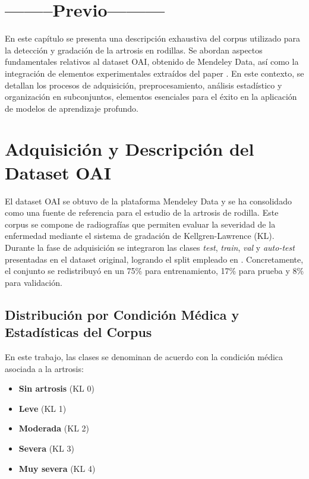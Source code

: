 \documentclass[11pt,spanish,listoffigures,listoftables]{tfgetsinf}
\begin{document}
\section{--------Previo---------}
En este capítulo se presenta una descripción exhaustiva del corpus utilizado para la detección y gradación de la artrosis en rodillas. Se abordan aspectos fundamentales relativos al dataset OAI, obtenido de Mendeley Data, así como la integración de elementos experimentales extraídos del paper \cite{efficientnet_paper}. En este contexto, se detallan los procesos de adquisición, preprocesamiento, análisis estadístico y organización en subconjuntos, elementos esenciales para el éxito en la aplicación de modelos de aprendizaje profundo.

\section{Adquisición y Descripción del Dataset OAI}
El dataset OAI se obtuvo de la plataforma Mendeley Data y se ha consolidado como una fuente de referencia para el estudio de la artrosis de rodilla. Este corpus se compone de radiografías que permiten evaluar la severidad de la enfermedad mediante el sistema de gradación de Kellgren-Lawrence (KL). Durante la fase de adquisición se integraron las clases \textit{test}, \textit{train}, \textit{val} y \textit{auto-test} presentadas en el dataset original, logrando el split empleado en \cite{efficientnet_paper}. Concretamente, el conjunto se redistribuyó en un 75\% para entrenamiento, 17\% para prueba y 8\% para validación.

\subsection{Distribución por Condición Médica y Estadísticas del Corpus}
En este trabajo, las clases se denominan de acuerdo con la condición médica asociada a la artrosis:
\begin{itemize}
    \item \textbf{Sin artrosis} (KL 0)
    \item \textbf{Leve} (KL 1)
    \item \textbf{Moderada} (KL 2)
    \item \textbf{Severa} (KL 3)
    \item \textbf{Muy severa} (KL 4)
\end{itemize}
\end{document}
